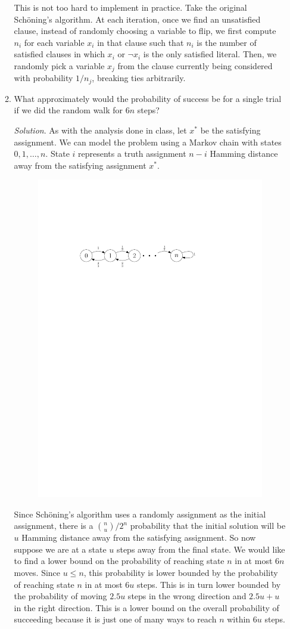\documentclass[11pt]{article}
\begin{document}
\begin{enumerate}[leftmargin=16pt]
\begin{enumerate}
        This is not too hard to implement in practice. Take the original Sch\"oning's algorithm. At each iteration, once we find an unsatisfied clause, instead of randomly choosing a variable to flip, we first compute $n_i$ for each variable $x_i$ in that clause such that $n_i$ is the number of satisfied clauses in which $x_i$ or $\neg x_i$ is the only satisfied literal. Then, we randomly pick a variable $x_j$ from the clause currently being considered with probability $1 / n_j$, breaking ties arbitrarily.

        \item What approximately would the probability of success be for a single trial if we did the random walk for $6n$ steps?
        
        \textit{Solution}. As with the analysis done in class, let $x^*$ be the satisfying assignment. We can model the problem using a Markov chain with states $0,1,\ldots, n$. State $i$ represents a truth assignment $n-i$ Hamming distance away from the satisfying assignment $x^*$.
        
        \begin{figure}[h]
            \centering
            \includegraphics[width=0.5\linewidth]{markov-chain.pdf}
        \end{figure}

        Since Sch\"oning's algorithm uses a randomly assignment as the initial assignment, there is a $\binom{n}{u} / 2^n$ probability that the initial solution will be $u$ Hamming distance away from the satisfying assignment. So now suppose we are at a state $u$ steps away from the final state. We would like to find a lower bound on the probability of reaching state $n$ in at most $6n$ moves. Since $u \leq n$, this probability is lower bounded by the probability of reaching state $n$ in at most $6u$ steps. This is in turn lower bounded by the probability of moving $2.5u$ steps in the wrong direction and $2.5u + u$ in the right direction. This is a lower bound on the overall probability of succeeding because it is just one of many ways to reach $n$ within $6u$ steps.


\end{enumerate}
\end{enumerate}
\end{document}
